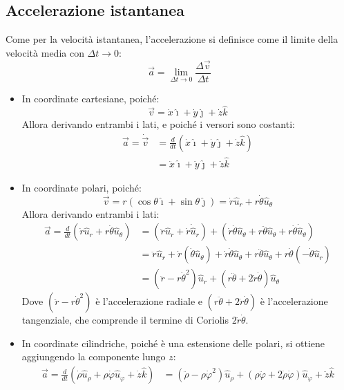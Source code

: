 \documentclass[11pt, a4paper, openright]{book}
\theoremstyle{plain}
\theoremstyle{definition}
\begin{document}
\subsection{Accelerazione istantanea}
Come per la velocità istantanea, l'accelerazione si definisce come il limite della velocità media con $\Delta t \rightarrow 0$:
\[\vec{a} = \lim_{\Delta t \rightarrow 0} \frac{\Delta\vec{v}}{\Delta t}\]
\begin{itemize}
    \item In coordinate cartesiane, poiché:
        \[\vec{v} = \dot{x}\hat{\imath} + \dot{y}\hat{\jmath} + \dot{z}\hat{k}\]
        Allora derivando entrambi i lati, e poiché i versori sono costanti:
        \begin{align}
            \vec{a} = \dot{\vec{v}} & = \frac{d}{dt}(\dot{x}\hat{\imath} + \dot{y}\hat{\jmath} + \dot{z}\hat{k}) \\
            & = \ddot{x}\hat{\imath} + \ddot{y}\hat{\jmath} + \ddot{z}\hat{k}
        \end{align}
    \item In coordinate polari, poiché:
        \[\vec{v} = r(\cos\theta\hat{\imath} + \sin\theta\hat{\jmath}) = \dot{r}\hat{u}_r + r\dot{\theta}\hat{u}_\theta\]
        Allora derivando entrambi i lati:
        \begin{align}
            \vec{a} = \frac{d}{dt}(\dot{r}\hat{u}_r + r\dot{\theta}\hat{u}_\theta) & = (\ddot{r}\hat{u}_r + \dot{r}\dot{\hat{u}}_r) + (\dot{r}\dot{\theta}\hat{u}_\theta + r\ddot{\theta}\hat{u}_\theta + r\dot{\theta}\dot{\hat{u}}_\theta) \\
            & = \ddot{r}\hat{u}_r + \dot{r}(\dot{\theta}\hat{u}_\theta) + \dot{r}\dot{\theta}\hat{u}_\theta + r\ddot{\theta}\hat{u}_\theta + r\dot{\theta}(-\dot{\theta}\hat{u}_r) \\
            & = (\ddot{r} - r\dot{\theta}^2)\hat{u}_r + (r\ddot{\theta} + 2\dot{r}\dot{\theta})\hat{u}_\theta
        \end{align}
        Dove $(\ddot{r} - r\dot{\theta}^2)$ è l'accelerazione radiale e $(r\ddot{\theta} + 2\dot{r}\dot{\theta})$ è l'accelerazione tangenziale, che comprende il termine di Coriolis $2\dot{r}\dot{\theta}$.
    
    \item In coordinate cilindriche, poiché è una estensione delle polari, si ottiene aggiungendo la componente lungo $z$:
        \begin{align}
            \vec{a} = \frac{d}{dt}(\dot{\rho}\hat{u}_\rho + \rho\dot{\varphi}\hat{u}_\varphi + \dot{z}\hat{k}) & = (\ddot{\rho} - \rho\dot{\varphi}^2)\hat{u}_\rho + (\rho\ddot{\varphi} + 2\dot{\rho}\dot{\varphi})\hat{u}_\varphi + \ddot{z}\hat{k}
        \end{align}
    

\end{itemize}
\end{document}
